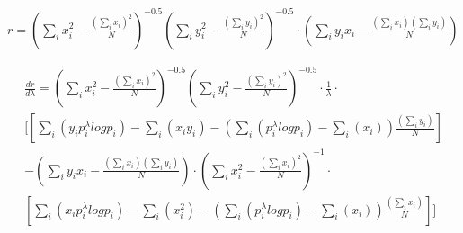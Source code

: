 \newpage

\begin{math}
r=\left(\sum_i{x_i^2}-\frac{\left(\sum_i{x_i}\right)^2}{N}\right)^{-0.5} 
\left(\sum_i{y_i^2}-\frac{\left(\sum_i{y_i}\right)^2}{N}\right)^{-0.5}\cdot
\left(\sum_i{y_ix_i} - \frac{\left(\sum_ix_i\right)\left(\sum_iy_i\right)}{N}\right)
\end{math}

\begin{multline}
\frac{dr}{d\lambda}=
\left(\sum_i{x_i^2}-\frac{\left(\sum_i{x_i}\right)^2}{N}\right)^{-0.5} 
\left(\sum_i{y_i^2}-\frac{\left(\sum_i{y_i}\right)^2}{N}\right)^{-0.5}\cdot\frac{1}{\lambda}\cdot  \\
[
\left[
\sum_i\left(y_ip_i^{\lambda}log{p_i}\right) -  
\sum_i\left(x_iy_i\right) -  
\left( \sum_i\left(p_i^{\lambda}log{p_i}\right) - \sum_i\left(x_i\right)  \right)\frac{\left(\sum_iy_i\right)}{N}
\right]  \\
-
\left(\sum_i{y_ix_i} - \frac{\left(\sum_ix_i\right)\left(\sum_iy_i\right)}{N}\right)\cdot
\left(\sum_i{x_i^2}-\frac{\left(\sum_i{x_i}\right)^2}{N}\right)^{-1} 
\cdot\\
\left[
\sum_i \left(x_ip_i^{\lambda}log{p_i}\right) - \sum_i \left(x_i^2\right)
-\left( \sum_i \left(p_i^{\lambda}log{p_i}\right) -\sum_i \left(x_i\right) \right)\frac{\left(\sum_i{x_i}\right)}{N} 
\right]
]
\end{multline}


